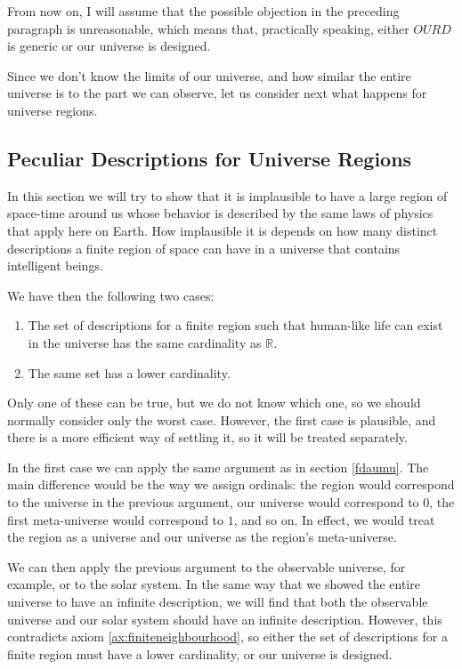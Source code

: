 \documentclass[a4paper
,draft
]{article}
\def\reale{\mathbb{R}}
\def\our_description{OURD}
\begin{document}
From now on, I will assume that the possible objection in the preceding
paragraph is unreasonable, which means that, practically speaking,
either $\our_description$ is generic or our universe is designed.

Since we don't know the limits of our universe, and how similar
the entire universe is to the part we can observe, let us consider next
what happens for universe regions.

\subsection{Peculiar Descriptions for Universe Regions}
\label{sec:peculiarregions}

In this section we will try to show that it is implausible to have a large
region of space-time around us whose behavior is described by the same laws
of physics that apply here on Earth.
How implausible it is depends on how many
distinct descriptions a finite region of space can have in a universe
that contains intelligent beings.

We have then the following two cases:
\begin{enumerate}
  \item The set of descriptions for a finite region such that human-like life
      can exist in the universe has the same cardinality as $\reale$.
  \item The same set has a lower cardinality.
\end{enumerate}
Only one of these can be true, but we do not know which one, so we should
normally consider only the worst case. However, the first case is plausible,
and there is a more efficient way of settling it, so it will be treated
separately.

In the first case we can apply the same argument
as in section \ref{fdaumu}. The main difference would be the way we assign
ordinals: the region would correspond to the universe in the previous argument,
our universe would correspond to $0$,
the first meta-universe would correspond
to $1$, and so on. In effect, we would treat the region as a universe
and our universe as the region's meta-universe.

We can then apply the previous argument to the observable universe, for example, or
to the solar system.
In the same way that we showed the entire universe to have
an infinite description, we will find that both the observable universe
and our solar system should have an infinite description.
However, this contradicts axiom \ref{ax:finiteneighbourhood}, so either the
set of descriptions for a finite region must have a lower cardinality, or our
universe is designed.
\end{document}
